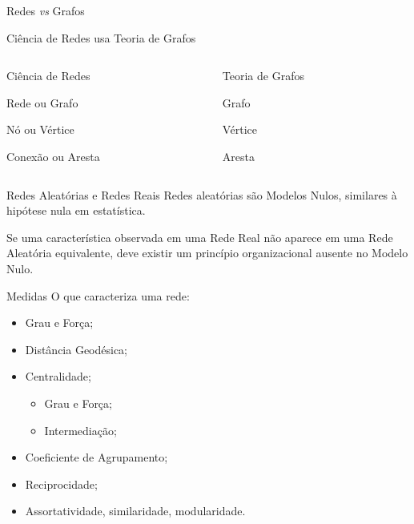 \documentclass[10pt, hyperref={pdfpagelabels=false}]{beamer}
\begin{document}
\begin{frame}[c, label=redes-vs-grafos]{Redes \textit{vs} Grafos}
  \begin{center}
    \Large
    Ciência de Redes \alert{usa} Teoria de Grafos
    
    \vspace{\baselineskip}
    
    \begin{columns}[T,onlytextwidth]
      \begin{column}{0.5\textwidth}
        \centering
        \alert{Ciência de Redes}

        \large
        Rede ou Grafo
        
        Nó ou Vértice
        
        Conexão ou Aresta
      \end{column}

      \begin{column}{0.5\textwidth}
        \centering
        \alert{Teoria de Grafos}

        \large
        Grafo

        Vértice

        Aresta
      \end{column}
    \end{columns}
  \end{center}
\end{frame}

\begin{frame}[label=redes]{Redes Aleatórias e Redes Reais}
\large
Redes aleatórias são \alert{Modelos Nulos}, similares à hipótese nula em estatística.

Se uma característica observada em uma \alert{Rede Real} não aparece em uma \alert{Rede Aleatória} equivalente, deve existir um \alert{princípio organizacional} ausente no Modelo Nulo.
\end{frame}

\begin{frame}[label=medidas]{Medidas}
  \large
  O que caracteriza uma rede:
  \begin{itemize}
    \item Grau e Força;
    \item Distância Geodésica;
    \item Centralidade;
    \begin{itemize}
      \item Grau e Força;
      \item Intermediação;
    \end{itemize}
    \item Coeficiente de Agrupamento;
    \item Reciprocidade;
    \item Assortatividade, similaridade, modularidade.
  \end{itemize}
\end{frame}
\end{document}
